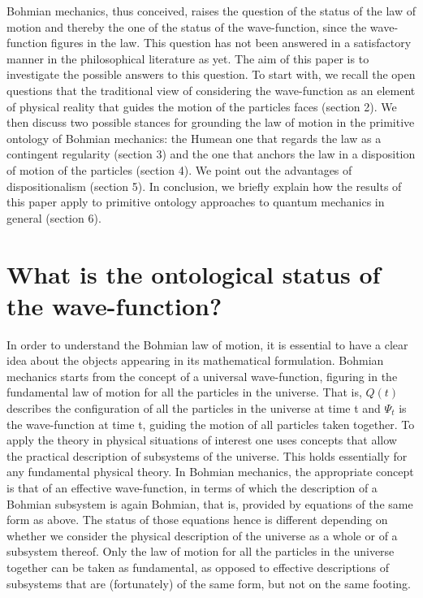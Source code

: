 \documentclass[12pt]{article}
\theoremstyle{definition}
\begin{document}
Bohmian mechanics, thus conceived, raises the question of the status of the law of motion and thereby the one of the status of the wave-function, since the wave-function figures in the law. This question has not been answered in a satisfactory manner in the philosophical literature as yet. The aim of this paper is to investigate the possible answers to this question. To start with, we recall the open questions that the traditional view of considering the wave-function as an element of physical reality that guides the motion of the particles faces (section 2). We then discuss two possible stances for grounding the law of motion in the primitive ontology of Bohmian mechanics: the Humean one that regards the law as a contingent regularity (section 3) and the one that anchors the law in a disposition of motion of the particles (section 4). We point out the advantages of dispositionalism (section 5). In conclusion, we briefly explain how the results of this paper apply to primitive ontology approaches to quantum mechanics in general (section 6).

\section{What is the ontological status of the wave-function?}
In order to understand the Bohmian law of motion, it is essential to have a clear idea about the objects appearing in its mathematical formulation. Bohmian mechanics starts from the concept of a universal wave-function, figuring in the fundamental law of motion for all the particles in the universe. That is, $Q(t)$ describes the configuration of all the particles in the universe at time t and $\Psi_t$ is the wave-function at time t, guiding the motion of all particles taken together. To apply the theory in physical situations of interest one uses concepts that allow the practical description of subsystems of the universe. This holds essentially for any fundamental physical theory. In Bohmian mechanics, the appropriate concept is that of an effective wave-function, in terms of which the description of a Bohmian subsystem is again Bohmian, that is, provided by equations of the same form as above. The status of those equations hence is different depending on whether we consider the physical description of the universe as a whole or of a subsystem thereof. Only the law of motion for all the particles in the universe together can be taken as fundamental, as opposed to effective descriptions of subsystems that are (fortunately) of the same form, but not on the same footing.
\end{document}
